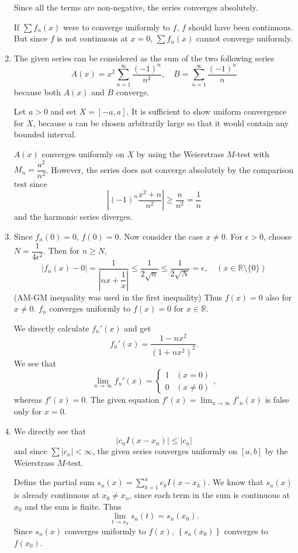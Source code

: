 \documentclass[12pt]{report}
\newcommand{\numl}[1]{\item[\large\textbf{\sffamily #1.}]}
\newcommand{\ds}{\displaystyle}
\newcommand{\bs}{\setminus}
\newcommand{\abs}[1]{\left| #1 \right|}
\newcommand{\seq}[1]{\left\{ #1 \right\}}
\newcommand{\ra}{\rightarrow}
\newcommand{\R}{\mathbb{R}}
\begin{document}
\begin{enumerate}
    Since all the terms are non-negative, the series converges absolutely.

    If \(\sum f_n(x)\) were to converge uniformly to \(f\), \(f\) should have been continuous. But since \(f\) is not continuous at \(x = 0\), \(\sum f_n(x)\) cannot converge uniformly.

    \numl{4} The given series can be considered as the sum of the two following series
    \[
        A(x) = x^2 \sum_{n=1}^\infty \frac{(-1)^n}{n^2}, \quad B = \sum_{n=1}^\infty \frac{(-1)^n}{n}
    \]
    because both \(A(x)\) and \(B\) converge.

    Let \(a > 0\) and set \(X = [-a, a]\). It is sufficient to show uniform convergence for \(X\), because \(a\) can be chosen arbitrarily large so that it would contain any bounded interval.

    \(A(x)\) converges uniformly on \(X\) by using the Weierstrass \(M\)-test with \(M_n = \dfrac{a^2}{n^2}\). However, the series does not converge absolutely by the comparison test since
    \[
        \abs{(-1)^n \frac{x^2 + n}{n^2}} \geq \frac{n}{n^2} = \frac{1}{n}
    \]
    and the harmonic series diverges.

    \numl{5} Since \(f_n(0) = 0\), \(f(0) = 0\). Now consider the case \(x \neq 0\). For \(\epsilon > 0\), choose \(N = \dfrac{1}{4\epsilon^2}\). Then for \(n \geq N\),
    \[
        \abs{f_n(x) - 0} = \frac{1}{\abs{nx + \dfrac{1}{x}}} \leq \frac{1}{2\sqrt{n}} \leq \frac{1}{2\sqrt{N}} = \epsilon, \quad (x \in \R\bs\{0\})
    \]
    (AM-GM inequality was used in the first inequality) Thus \(f(x) = 0\) also for \(x \neq 0\). \(f_n\) converges uniformly to \(f(x) = 0\) for \(x \in \R\).

    We directly calculate \(f_n'(x)\) and get
    \[
        f_n'(x) = \frac{1 - nx^2}{(1 + nx^2)^2}.
    \]
    We see that
    \[
        \lim_{n\ra\infty} f_n'(x) = \begin{cases}
            1 & (x = 0) \\ 0 & (x \neq 0)
        \end{cases},
    \]
    whereas \(f'(x) = 0\). The given equation \(f'(x) = \ds \lim_{n \ra \infty} f'_n(x)\) is false only for \(x = 0\).

    \numl{6} We directly see that
    \[
        \abs{c_n I(x - x_n)} \leq \abs{c_n}
    \]
    and since \(\sum \abs{c_n} < \infty\), the given series converges uniformly on \([a, b]\) by the Weierstrass \(M\)-test.

    Define the partial sum \(s_n(x) = \ds \sum_{k =1}^n c_k I(x - x_k)\). We know that \(s_n(x)\) is already continuous at \(x_0 \neq x_n\), since each term in the sum is continuous at \(x_0\) and the sum is finite. Thus
    \[
        \lim_{t \ra x_0} s_n(t) = s_n(x_0).
    \]
    Since \(s_n(x)\) converges uniformly to \(f(x)\), \(\seq{s_n(x_0)}\) converges to \(f(x_0)\).


\end{enumerate}
\end{document}
